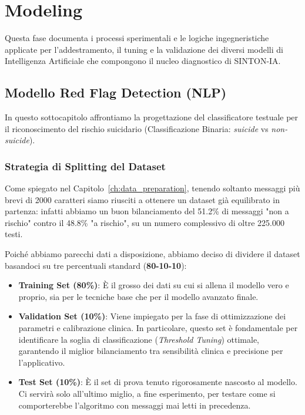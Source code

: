 \chapter{Modeling}
\label{ch:modeling}

Questa fase documenta i processi sperimentali e le logiche ingegneristiche applicate per l'addestramento, il tuning e la validazione dei diversi modelli di Intelligenza Artificiale che compongono il nucleo diagnostico di SINTON-IA.

\section{Modello Red Flag Detection (NLP)}
\label{sec:mod_red_flag}

In questo sottocapitolo affrontiamo la progettazione del classificatore testuale per il riconoscimento del rischio suicidario (Classificazione Binaria: \textit{suicide} vs \textit{non-suicide}).

\subsection{Strategia di Splitting del Dataset}
Come spiegato nel Capitolo~\ref{ch:data_preparation}, tenendo soltanto messaggi più brevi di 2000 caratteri siamo riusciti a ottenere un dataset già equilibrato in partenza: infatti abbiamo un buon bilanciamento del 51.2\% di messaggi "non a rischio" contro il 48.8\% "a rischio", su un numero complessivo di oltre 225.000 testi.

Poiché abbiamo parecchi dati a disposizione, abbiamo deciso di dividere il dataset basandoci su tre percentuali standard (\textbf{80-10-10}):
\begin{itemize}
    \item \textbf{Training Set (80\%)}: È il grosso dei dati su cui si allena il modello vero e proprio, sia per le tecniche base che per il modello avanzato finale.
    \item \textbf{Validation Set (10\%)}: Viene impiegato per la fase di ottimizzazione dei parametri e calibrazione clinica. In particolare, questo set è fondamentale per identificare la soglia di classificazione (\textit{Threshold Tuning}) ottimale, garantendo il miglior bilanciamento tra sensibilità clinica e precisione per l'applicativo.
    \item \textbf{Test Set (10\%)}: È il set di prova tenuto rigorosamente nascosto al modello. Ci servirà solo all'ultimo miglio, a fine esperimento, per testare come si comporterebbe l'algoritmo con messaggi mai letti in precedenza.
\end{itemize}

